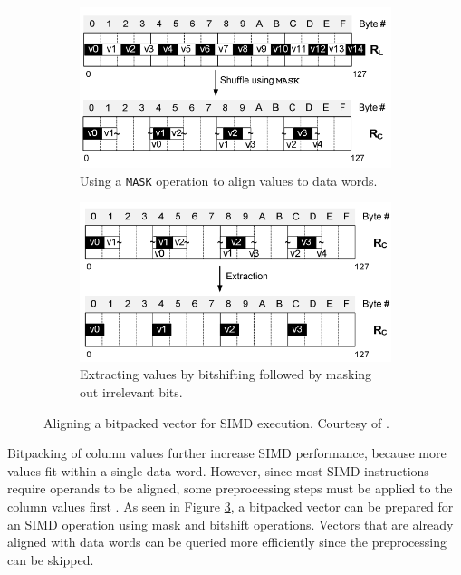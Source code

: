 \begin{figure}
  \centering
  \begin{subfigure}{0.45\textwidth}
    \includegraphics[width=\textwidth]{img/simd-align-1.png}
    \caption{Using a \texttt{MASK} operation to align values to data words.}
    \label{fig:simd-align-1} 
  \end{subfigure}
  \begin{subfigure}{0.45\textwidth}
    \includegraphics[width=\textwidth]{img/simd-align-2.png}
    \caption{Extracting values by bitshifting followed by masking out irrelevant bits.}
    \label{fig:simd-align-2} 
  \end{subfigure}
  \caption{Aligning a bitpacked vector for SIMD execution. Courtesy of \cite{Willhalm2009-hu}.}
  \label{fig:simd-align} 
\end{figure}

Bitpacking of column values further increase SIMD performance, because more values fit within a single data word. However, since most SIMD instructions require operands to be aligned, some preprocessing steps must be applied to the column values first \cite{Willhalm2009-hu}. As seen in Figure \ref{fig:simd-align}, a bitpacked vector can be prepared for an SIMD operation using mask and bitshift operations. Vectors that are already aligned with data words can be queried more efficiently since the preprocessing can be skipped.

